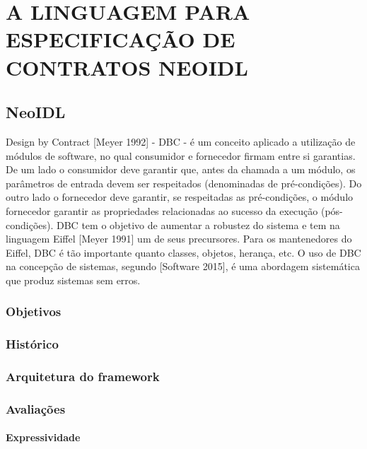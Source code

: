 \chapter{A LINGUAGEM PARA ESPECIFICAÇÃO DE CONTRATOS NEOIDL}
\vspace{-6mm}
%

\section{NeoIDL}

Design by Contract [Meyer 1992] - DBC - é um conceito aplicado a utilização de
módulos de software, no qual consumidor e fornecedor firmam entre si garantias. 
De um lado o consumidor deve garantir que, antes da chamada a um módulo, os
parâmetros de entrada devem ser respeitados (denominadas de pré-condições).
Do outro lado o fornecedor deve garantir, se respeitadas as pré-condições,
o módulo fornecedor garantir as propriedades relacionadas ao sucesso da
execução (pós-condições).
DBC tem o objetivo de aumentar a robustez do sistema e tem na linguagem Eiffel
[Meyer 1991] um de seus precursores. Para os mantenedores do Eiffel, DBC é
tão importante quanto classes, objetos, herança, etc. O uso de DBC na
concepção de sistemas, segundo [Software 2015], é uma abordagem
sistemática que produz sistemas sem erros.

\subsection{Objetivos}
\vspace{-6mm}

\subsection{Histórico}
\vspace{-6mm}

\subsection{Arquitetura do framework}
\vspace{-6mm}


\subsection{Avaliações}
\vspace{-6mm}

\subsubsection{Expressividade}
\vspace{-6mm}

